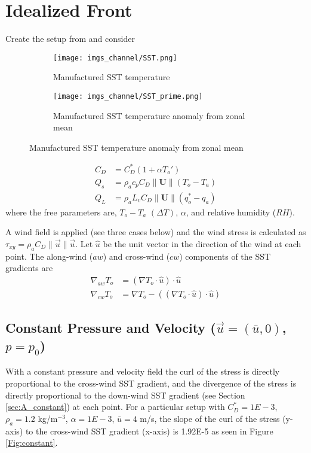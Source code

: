 \documentclass[12pt,a4paper]{article}
\newcommand{\Vmag}[1]{\| \mathbf{#1}\|}
\begin{document}
\section{Idealized Front}
Create the setup from \citet{Foussard2019} and consider

\begin{figure}[h!]
\begin{subfigure}[t]{0.5\textwidth}
\texttt{[image: imgs\_channel/SST.png]}
\caption{Manufactured SST temperature }
\end{subfigure}
\begin{subfigure}[t]{0.5\textwidth}
\texttt{[image: imgs\_channel/SST\_prime.png]}
\caption{Manufactured SST temperature anomaly from zonal mean}
\end{subfigure}
\end{figure}

\begin{align}
C_D &= C_D^*(1+\alpha T_o')\\
Q_s &= \rho_a c_p C_D \Vmag{U} (T_o-T_a)\\
Q_L &= \rho_a L_v C_D \Vmag{U} (q_o^*-q_a)
\end{align}
where the free parameters are, $T_o-T_a$ $(\Delta T)$, $\alpha$, and relative humidity ($RH$).

A wind field is applied (see three cases below) and the wind stress is calculated as $\tau_{xy} = \rho_a C_D \| \vec{u} \|\vec{u}$. Let $\hat{u}$ be the unit vector in the direction of the wind at each point. The along-wind ($aw$) and cross-wind ($cw$) components of the SST gradients are
\begin{align}
\nabla_{aw} T_o &= (\nabla T_o \cdot \hat{u}) \cdot \hat{u}\\
\nabla_{cw} T_o &= \nabla T_o - \left( \left(\nabla T_o \cdot \hat{u}\right) \cdot \hat{u} \right)
\end{align}

\subsection{Constant Pressure and Velocity ($\vec{u} = (\bar{u},0)$, $p = p_0$)}

With a constant pressure and velocity field the curl of the stress is directly proportional to the cross-wind SST gradient, and  the divergence of the stress is directly proportional to the down-wind SST gradient (see Section \ref{sec:A_constant}) at each point. For a particular setup with $C_D^* = 1E-3$, $\rho_a = 1.2$ kg/m$^{-3}$, $\alpha = 1E-3$, $\bar{u} = 4$ m/s, the slope of the curl of the stress (y-axis) to the cross-wind SST gradient (x-axis) is 1.92E-5 as seen in Figure \ref{Fig:constant}.
\end{document}
